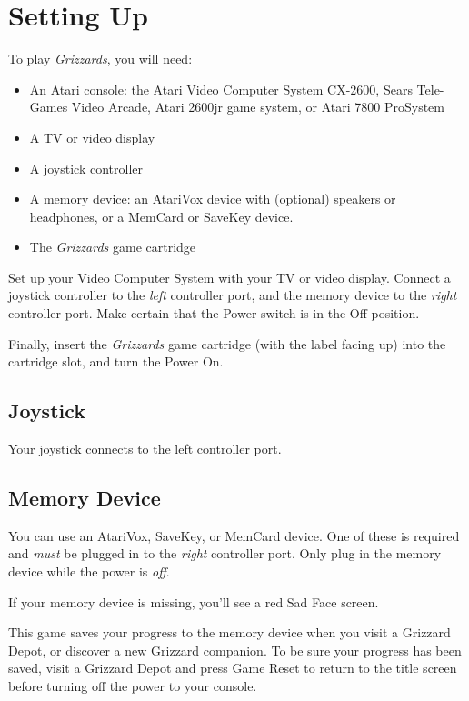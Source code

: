 \documentclass[12pt,openright,book]{memoir}
\begin{document}
\cleardoublepage

\tableofcontents

\chapter{Setting Up}\label{Setting Up}

To play \textit{Grizzards}, you will need:

\begin{itemize}
\item An Atari  console: the Atari Video Computer  System CX-2600, Sears
  Tele-Games  Video Arcade,  Atari  2600jr game  system,  or Atari  7800
  ProSystem
\item A TV or video display
\item A joystick controller
\item A  memory device: an  AtariVox device with (optional)  speakers or
  headphones, or a MemCard or SaveKey device.
\item The \textit{Grizzards} game cartridge
\end{itemize}

Set  up your  Video  Computer  System with  your  TV  or video  display.
Connect a  joystick controller to  the \emph{left} controller  port, and
the memory device to the \emph{right} controller port. Make certain that
the Power switch is in the Off position.

Finally, insert the \textit{Grizzards} game  cartridge (with the label facing up)
into the cartridge slot, and turn the Power On.

\section{Joystick}

Your joystick  connects to the  left controller port.

\section{Memory Device}

You can  use an AtariVox,  SaveKey, or MemCard  device. One of  these is
required and  \emph{must} be plugged  in to the  \emph{right} controller
port. Only plug in the memory device while the power is \emph{off}.

If your memory device is missing, you'll see a red Sad Face screen.

This  game saves  your  progress to  the memory  device  when you  visit
a Grizzard Depot, or discover a  new Grizzard companion. To be sure your
progress has been saved, visit a  Grizzard Depot and press Game Reset to
return to the title screen before turning off the power to your console.
\end{document}
